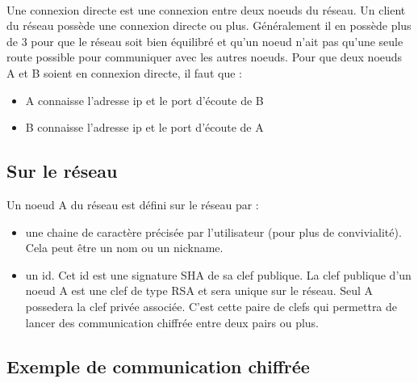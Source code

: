\documentclass[french,11pt,a4]{article}
\begin{document}
\paragraph{}
Une connexion directe est une connexion entre deux noeuds du réseau. Un client du réseau possède une connexion directe ou plus. Généralement il en possède plus de 3 pour que le réseau soit bien équilibré et qu'un noeud n'ait pas qu'une seule route possible pour communiquer avec les autres noeuds. Pour que deux noeuds A et B soient en connexion directe, il faut que :

\begin{itemize}
\item{A connaisse l'adresse ip et le port d'écoute de B}
\item{B connaisse l'adresse ip et le port d'écoute de A}
\end{itemize}

\subsection{Sur le réseau}

Un noeud A du réseau est défini sur le réseau par :

\begin{itemize}
\item{une chaine de caractère précisée par l'utilisateur (pour plus de convivialité). Cela peut être un nom ou un nickname.}
\item{un id. Cet id est une signature SHA de sa clef publique. La clef publique d'un noeud A est une clef de type RSA et sera unique sur le réseau. Seul A possedera la clef privée associée. C'est cette paire de clefs qui permettra de lancer des communication chiffrée entre deux pairs ou plus.}
\end{itemize}
\subsection{Exemple de communication chiffrée}
\end{document}

